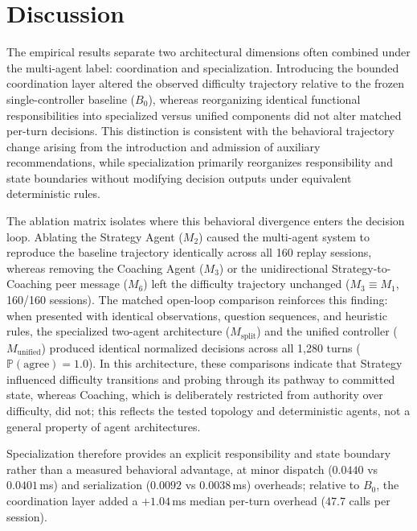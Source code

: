 \section{Discussion}\label{sec:disc}
The empirical results separate two architectural dimensions often combined under the multi-agent label: coordination and specialization. Introducing the bounded coordination layer altered the observed difficulty trajectory relative to the frozen single-controller baseline ($B_0$), whereas reorganizing identical functional responsibilities into specialized versus unified components did not alter matched per-turn decisions. This distinction is consistent with the behavioral trajectory change arising from the introduction and admission of auxiliary recommendations, while specialization primarily reorganizes responsibility and state boundaries without modifying decision outputs under equivalent deterministic rules.

The ablation matrix isolates where this behavioral divergence enters the decision loop. Ablating the Strategy Agent ($M_2$) caused the multi-agent system to reproduce the baseline trajectory identically across all 160 replay sessions, whereas removing the Coaching Agent ($M_3$) or the unidirectional Strategy-to-Coaching peer message ($M_6$) left the difficulty trajectory unchanged ($M_3 \equiv M_1$, 160/160 sessions). The matched open-loop comparison reinforces this finding: when presented with identical observations, question sequences, and heuristic rules, the specialized two-agent architecture ($M_{\text{split}}$) and the unified controller ($M_{\text{unified}}$) produced identical normalized decisions across all 1,280 turns ($\mathbb{P}(\text{agree}) = 1.0$). In this architecture, these comparisons indicate that Strategy influenced difficulty transitions and probing through its pathway to committed state, whereas Coaching, which is deliberately restricted from authority over difficulty, did not; this reflects the tested topology and deterministic agents, not a general property of agent architectures.

Specialization therefore provides an explicit responsibility and state boundary rather than a measured behavioral advantage, at minor dispatch ($0.0440$ vs $0.0401$\,ms) and serialization ($0.0092$ vs $0.0038$\,ms) overheads; relative to $B_0$, the coordination layer added a $+1.04$\,ms median per-turn overhead (47.7 calls per session).

